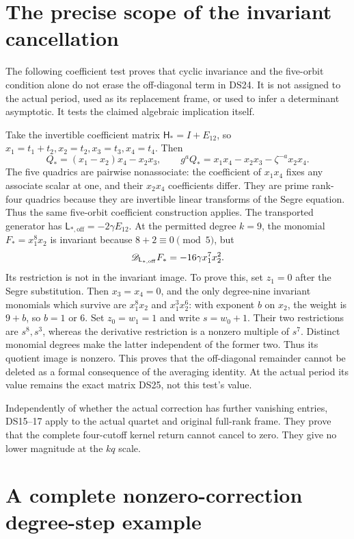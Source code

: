\section{The precise scope of the invariant cancellation}

The following coefficient test proves that cyclic invariance and the
five-orbit condition alone do not erase the off-diagonal term in DS24.
It is not assigned to the actual period, used as its replacement frame,
or used to infer a determinant asymptotic. It tests the claimed
algebraic implication itself.

Take the invertible coefficient matrix
\(\mathsf H_*=I+E_{12}\), so
\(x_1=t_1+t_2,x_2=t_2,x_3=t_3,x_4=t_4\). Then
\[
Q_*=(x_1-x_2)x_4-x_2x_3,
\qquad g^aQ_*=x_1x_4-x_2x_3-\zeta^{-a}x_2x_4.
\]
The five quadrics are pairwise nonassociate: the coefficient of
\(x_1x_4\) fixes any associate scalar at one, and their
\(x_2x_4\) coefficients differ. They are prime rank-four quadrics
because they are invertible linear transforms of the Segre equation.
Thus the same five-orbit coefficient construction applies.
The transported generator has
\(\mathsf L_{*,\mathrm{off}}=-2\gamma E_{12}\).
At the permitted degree \(k=9\), the monomial
\(F_*=x_1^8x_2\) is invariant because \(8+2\equiv0\pmod5\), but
\[
\mathscr D_{\mathsf L_{*,\mathrm{off}}}F_*
=-16\gamma x_1^7x_2^2.
\]
Its restriction is not in the invariant image. To prove this, set
\(z_1=0\) after the Segre substitution. Then \(x_3=x_4=0\), and
the only degree-nine invariant monomials which survive are
\(x_1^8x_2\) and \(x_1^3x_2^6\): with exponent \(b\) on
\(x_2\), the weight is \(9+b\), so \(b=1\) or \(6\).
Set \(z_0=w_1=1\) and write \(s=w_0+1\). Their two restrictions
are \(s^8,s^3\), whereas the derivative restriction is a nonzero
multiple of \(s^7\). Distinct monomial degrees make the latter
independent of the former two. Thus its quotient image is nonzero.
This proves that the off-diagonal remainder cannot be deleted as a
formal consequence of the averaging identity. At the actual period
its value remains the exact matrix DS25, not this test's value.

Independently of whether the actual correction has further vanishing
entries, DS15--17 apply to the actual quartet and original full-rank
frame. They prove that the complete four-cutoff kernel return cannot
cancel to zero. They give no lower magnitude at the \(kq\) scale.

\section{A complete nonzero-correction degree-step example}

